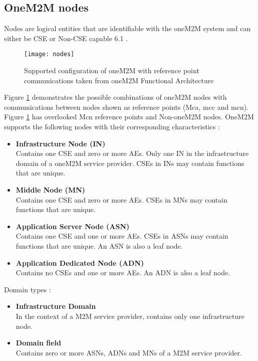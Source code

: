 \subsection{OneM2M nodes}

Nodes are logical entities that are identifiable with the oneM2M system and can either be CSE or Non-CSE capable 6.1 \cite{oneM2M2016OneM2MArchitecture}. 

\begin{figure}[H]
\texttt{[image: nodes]}
\caption[Supported configuration of oneM2M with reference point communications taken from oneM2M Functional Architecture]{Supported configuration of oneM2M with reference point communications taken from oneM2M Functional Architecture \cite{oneM2M2016OneM2MArchitecture}}
\label{fig:nodes}
\end{figure}

Figure \ref{fig:nodes} demonstrates the possible combinations of oneM2M nodes with communications between nodes shown as reference points (Mca, mcc and mcn). Figure \ref{fig:nodes} has overlooked Mcn reference points and Non-oneM2M nodes. OneM2M supports the following nodes with their corresponding characteristics \cite{oneM2M2016OneM2MArchitecture}:

\begin{itemize}
  \item \textbf{Infrastructure Node (IN)}\\ 
  Contains one CSE and zero or more AEs. Only one IN in the infrastructure domain of a oneM2M service provider. CSEs in INs may contain functions that are unique. 
  \item \textbf{Middle Node (MN)}\\ 
  Contains one CSE and zero or more AEs. CSEs in MNs may contain functions that are unique. 
  \item \textbf{Application Server Node (ASN)}\\ 
  Contains one CSE and one or more AEs. CSEs in ASNs may contain functions that are unique. An ASN is also a leaf node.
  \item \textbf{Application Dedicated Node (ADN)}\\ 
  Contains no CSEs and one or more AEs. An ADN is also a leaf node.
\end{itemize}

Domain types \cite{oneM2M2016OneM2MArchitecture}:

\begin{itemize}
  \item \textbf{Infrastructure Domain}\\ 
  In the context of a M2M service provider, contains only one infrastructure node.
  \item \textbf{Domain field}\\ 
  Contains zero or more ASNs, ADNs and MNs of a M2M service provider.
\end{itemize}

